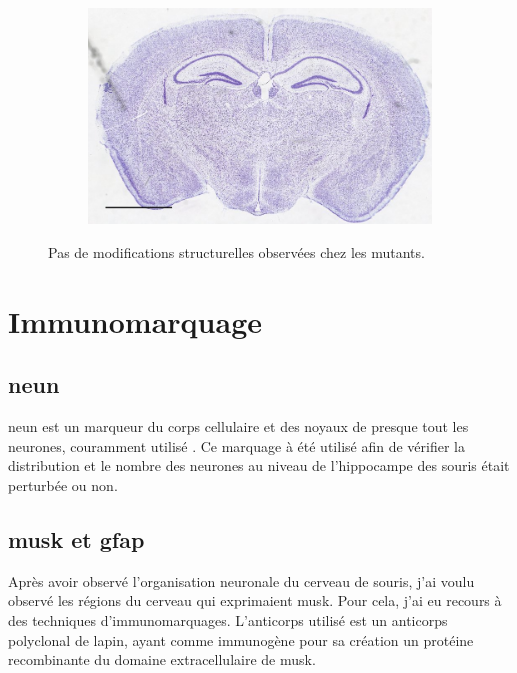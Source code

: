 \begin{figure}[h]
\begin{center}
\begin{subfigure}[h]{0.49\textwidth}
			\end{subfigure}
			\begin{subfigure}[h]{0.49\textwidth}%
				\caption{}
				\label{fig:MaleMutNissl}
				\includegraphics[width=\textwidth]{./Images/Nissl/MaleMut.jpg}
			\end{subfigure}
		\end{center}
		\caption{Pas de modifications structurelles observées chez les mutants.}
		\label{fig:NisslResultat}
	\end{figure}

\section{Immunomarquage}
\label{sec:IHC}

	\subsection{\acrshort{neun}}
	\label{ssec:neun}
	\Acrshort{neun} est un marqueur du  corps cellulaire et des noyaux de presque tout les neurones, couramment utilisé \cite{Guselnikova2015}. Ce marquage à été utilisé afin de vérifier la distribution et le nombre des neurones au niveau de l'hippocampe des souris \mcrd était perturbée ou non.
	
	\subsection{\acrshort{musk} et \acrshort{gfap}}
	\label{ssec:musk}
	Après avoir observé l'organisation neuronale du cerveau de souris, j'ai voulu observé les régions du cerveau qui exprimaient \gls{musk}. Pour cela, j'ai eu recours à des techniques d'immunomarquages. L'anticorps utilisé est un anticorps polyclonal de lapin, ayant comme immunogène pour sa création un protéine recombinante du domaine extracellulaire de \gls{musk}.
	
